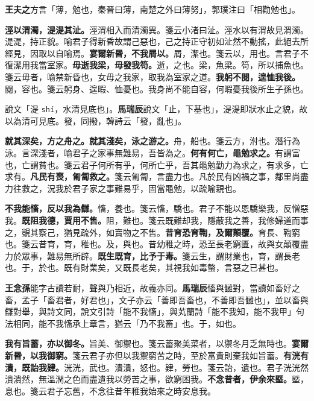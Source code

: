 \begin{quoting}\textbf{王夫之}方言「薄，勉也，秦晉曰薄，南楚之外曰薄努」，郭璞注曰「相勸勉也」。\end{quoting}

\textbf{涇以渭濁，湜湜其沚。}{\footnotesize 涇渭相入而清濁異。箋云小渚曰沚。涇水以有渭故見渭濁。湜湜，持正貌。喻君子得新昏故謂己惡也，己之持正守初如沚然不動搖，此絕去所經見，因取以自喻焉。}\textbf{宴爾新昬，不我屑以。}{\footnotesize 屑，潔也。箋云以，用也。言君子不復潔用我當室家。}\textbf{毋逝我梁，毋發我笱。}{\footnotesize 逝，之也。梁，魚梁。笱，所以捕魚也。箋云毋者，喻禁新昏也，女毋之我家，取我為室家之道。}\textbf{我躬不閱，遑恤我後。}{\footnotesize 閱，容也。箋云躬身、遑暇、恤憂也。我身尚不能自容，何暇憂我後所生子孫也。}

\begin{quoting}說文「湜 \texttt{shí}，水清見底也」。\textbf{馬瑞辰}說文「止，下基也」，湜湜即狀水止之貌，故以為清可見底。發，同撥，韓詩云「發，亂也」。\end{quoting}

\textbf{就其深矣，方之舟之。就其淺矣，泳之游之。}{\footnotesize 舟，船也。箋云方，泭也。潛行為泳。言深淺者，喻君子之家事無難易，吾皆為之。}\textbf{何有何亡，黽勉求之。}{\footnotesize 有謂富也，亡謂貧也。箋云君子何所有乎，何所亡乎，吾其黽勉勤力為求之，有求多，亡求有。}\textbf{凡民有喪，匍匐救之。}{\footnotesize 箋云匍匐，言盡力也。凡於民有凶禍之事，鄰里尚盡力往救之，況我於君子家之事難易乎，固當黽勉，以疏喻親也。}

\textbf{不我能慉，反以我為讎。}{\footnotesize 慉，養也。箋云慉，驕也。君子不能以恩驕樂我，反憎惡我。}\textbf{既阻我德，賈用不售。}{\footnotesize 阻，難也。箋云既難却我，隱蔽我之善，我修婦道而事之，覬其察己，猶見疏外，如賣物之不售。}\textbf{昔育恐育鞫，及爾顛覆。}{\footnotesize 育長、鞫窮也。箋云昔育，育，稚也。及，與也。昔幼稚之時，恐至長老窮匱，故與女顛覆盡力於眾事，難易無所辟。}\textbf{既生既育，比予于毒。}{\footnotesize 箋云生，謂財業也，育，謂長老也。于，於也。既有財業矣，又既長老矣，其視我如毒螫，言惡之已甚也。}

\begin{quoting}\textbf{王念孫}能字古讀若耐，聲與乃相近，故義亦同。\textbf{馬瑞辰}慉與讎對，當讀如畜好之畜，孟子「畜君者，好君也」，文子亦云「善即吾畜也，不善即吾讎也」，並以畜與讎對舉，與詩文同，說文引詩「能不我慉」，與芄蘭詩「能不我知，能不我甲」句法相同，能不我慉承上章言，猶云「乃不我畜」也。于，如也。\end{quoting}

\textbf{我有旨蓄，亦以御冬。}{\footnotesize 旨美、御禦也。箋云蓄聚美菜者，以禦冬月乏無時也。}\textbf{宴爾新昬，以我御窮。}{\footnotesize 箋云君子亦但以我禦窮苦之時，至於富貴則棄我如旨蓄。}\textbf{有洸有潰，既詒我肄。}{\footnotesize 洸洸，武也。潰潰，怒也。肄，勞也。箋云詒，遺也。君子洸洸然潰潰然，無溫潤之色而盡遺我以勞苦之事，欲窮困我。}\textbf{不念昔者，伊余來塈。}{\footnotesize 塈，息也。箋云君子忘舊，不念往昔年稚我始來之時安息我。}

